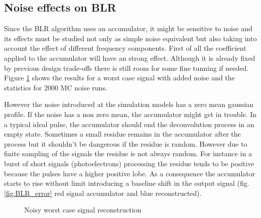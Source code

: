 \documentclass[a4paper,11pt]{report}
\begin{document}
\subsection{Noise effects on BLR}
Since the BLR algorithm uses an accumulator, it might be sensitive to noise and its effects must be studied not only as simple noise equivalent but also taking into account the effect of different frequency components. First of all the coefficient applied to the accumulator will have an strong effect. Although it is already fixed by previous design trade-offs there is still room for some fine tunning if needed. Figure \ref{fig:BLR_noise} shows the results for a worst case signal with added noise and the statistics for 2000 MC noise runs. 
\par However the noise introduced at the simulation models has a zero mean gaussian profile. If the noise has a non zero mean, the accumulator might get in trouble.  In a typical ideal pulse, the accumulator should end the deconvolution process in an empty state. Sometimes a small residue remains in the accumulator after the process but it shouldn't be dangerous if the residue is random. However due to finite sampling of the signals the residue is not always random. For instance in a burst of  short signals (photoelectrons) processing the residue tends to be positive because the pulses have a higher positive lobe. As a consequence the accumulator starts to rise without limit introducing a baseline shift in the output signal (fig. \ref{fig:BLR_error} red signal accumulator and blue reconstructed).


\begin{figure}[!tbp]
  \centering
  \hfill
  \caption{Noisy worst case signal reconstruction}
  \label{fig:BLR_noise}
\end{figure}
\end{document}
